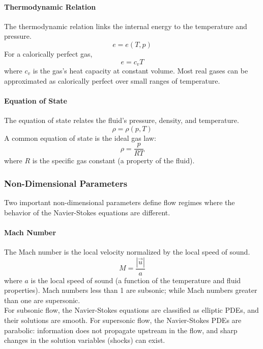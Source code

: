 \documentclass[paper=a4, fontsize=11pt]{scrartcl}
\numberwithin{equation}{section}        %
\numberwithin{figure}{section}          %
\numberwithin{table}{section}               %
\begin{document}
\paragraph{Thermodynamic Relation}
The thermodynamic relation links the internal energy to the temperature and pressure.
\begin{equation}
    e = e(T, p)
\end{equation}
For a calorically perfect gas,
\begin{equation}
    e = c_v T
\end{equation}
where $c_v$ is the gas's heat capacity at constant volume. Most real gases can be approximated as calorically perfect over small ranges of temperature.

\paragraph{Equation of State}
The equation of state relates the fluid's pressure, density, and temperature.
\begin{equation}
    \rho = \rho(p, T)
\end{equation}
A common equation of state is the ideal gas law:
\begin{equation}
    \rho = \frac{p}{R T}
\end{equation}
where $R$ is the specific gas constant (a property of the fluid).

\subsubsection{Non-Dimensional Parameters}
Two important non-dimensional parameters define flow regimes where the behavior of the Navier-Stokes equations are different.

\paragraph{Mach Number}
The Mach number is the local velocity normalized by the local speed of sound.
\begin{equation}
    M = \frac{|\vec{u}|}{a}
\end{equation}
where $a$ is the local speed of sound (a function of the temperature and fluid properties). Mach numbers less than 1 are subsonic; while Mach numbers greater than one are supersonic.\\
For subsonic flow, the Navier-Stokes equations are classified as elliptic PDEs, and their solutions are smooth. For supersonic flow, the Navier-Stokes PDEs are parabolic: information does not propagate upstream in the flow, and sharp changes in the solution variables (shocks) can exist.
\end{document}
